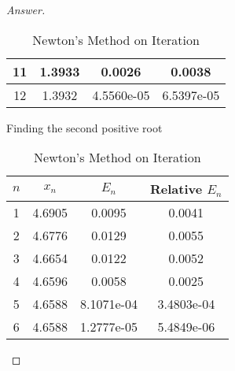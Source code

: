 \begin{proof}[Answer]
\begin{table}[htbp]
\begin{subtable}[t]{.48\linewidth}
\begin{tabular}[t]{|c|c|c|c|}
		11	&	1.3933	&	0.0026	&	0.0038	\\	\hline
		12	&	1.3932	&	4.5560e-05	&	6.5397e-05	\\	\hline
		\end{tabular}
	\end{subtable}
	\hfill
	\begin{subtable}[t]{.48\linewidth}
		\centering
		\caption{Finding the second positive root}
		\begin{tabular}[t]{|c|c|c|c|}
		\hline
		$n$ & \(x_n\) & \(E_n\) & Relative \(E_n\) \\	\hline
		1	&	4.6905	&	0.0095	&	0.0041	\\	\hline
		2	&	4.6776	&	0.0129	&	0.0055	\\	\hline
		3	&	4.6654	&	0.0122	&	0.0052	\\	\hline
		4	&	4.6596	&	0.0058	&	0.0025	\\	\hline
		5	&	4.6588	&	8.1071e-04	&	3.4803e-04	\\	\hline
		6	&	4.6588	&	1.2777e-05	&	5.4849e-06	\\	\hline
		\end{tabular}
	\end{subtable}
	\caption{Newton's Method on Iteration}
	\label{newtoniteration}
\end{table}

\end{proof}




